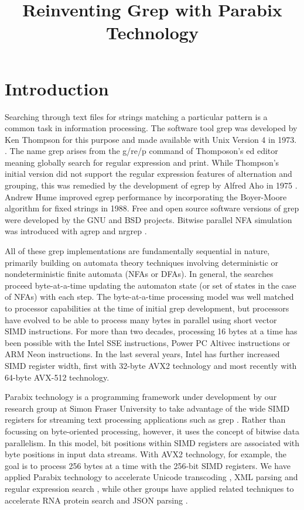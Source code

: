 \documentclass{article}
\title{Reinventing Grep with Parabix Technology}
\begin{document}
\maketitle

\section{Introduction}

Searching through text files for strings matching a particular
pattern is a common task in information processing.   
The software tool grep was developed by Ken Thompson for this
purpose and made available with Unix Version 4 in 1973.
\cite{mcilroy1987research}.
The name grep arises from the g/re/p command of Thomposon's
ed editor meaning globally search for regular expression and print.
While Thompson's initial version did not support the regular
expression features of alternation and grouping, this was
remedied by the development of egrep by Alfred Aho in 1975 \cite{hume1988tale}.
Andrew Hume improved egrep performance
by incorporating the Boyer-Moore algorithm for fixed strings in 1988.
Free and open source software versions of grep were developed
by the GNU and BSD projects.   Bitwise parallel NFA simulation 
was introduced with agrep \cite{wu1992agrep} and nrgrep \cite{navarro2001nr}.   

All of these grep implementations are fundamentally sequential in
nature, primarily building on automata theory techniques involving
deterministic or nondeterministic finite automata (NFAs or DFAs).
In general, the searches proceed byte-at-a-time updating the 
automaton state (or set of states in the case of NFAs) with each step.
The byte-at-a-time processing model was well matched to processor
capabilities at the time of initial grep development, but 
processors have evolved to be able to process many bytes in parallel 
using short vector SIMD instructions.   For more than two decades,
processing 16 bytes at a time has been possible with the Intel 
SSE instructions, Power PC Altivec instructions or
ARM Neon instructions.   In the last several years, Intel has further
increased SIMD register width, first with 32-byte AVX2 technology 
and most recently with 64-byte AVX-512 technology.   

Parabix technology is a programming framework under development by
our research group at Simon Fraser University  to take
advantage of the wide SIMD registers for streaming text processing
applications such as grep \cite{lin2012parabix}.   Rather than focussing on byte-oriented
processing, however, it uses the concept of bitwise data parallelism.
In this model, bit positions within SIMD registers are associated
with byte positions in input data streams.   With AVX2 technology,
for example, the goal is to process 256 bytes at a time with the
256-bit SIMD registers.   We have applied Parabix technology 
to accelerate Unicode transcoding \cite{cameron2008case}, XML parsing \cite{cameron2011parallel, medforth2013icxml} and regular
expression search  \cite{cameron2014bitwise}, while other groups have applied related techniques
to accelerate RNA protein search  \cite{peace2010exact} and JSON parsing \cite{li2017mison} .
\end{document}
